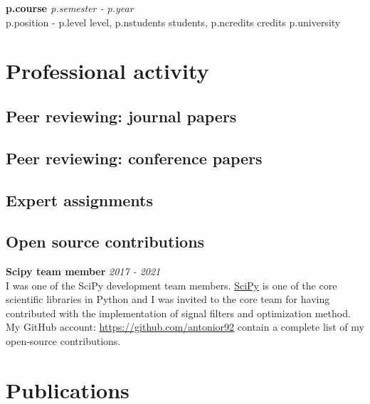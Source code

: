 \documentclass[10pt,letterpaper]{article} %
\newcommand{\cventry}[4]{ {\bf #1} \hfill {\em #2} \\ {\small \sc #3 \hfill  #4} }
\begin{document}
{{{{{{{{{{{{{%
    \cventry{ {{  p.course }}  }
    { {{ p.semester }} - {{ p.year }}  }
    { {{ p.position }}  - {{ p.level }} level, {{ p.nstudents }} students, {{ p.ncredits }} credits }
    { {{ p.university }}  } \\ {%



\section*{Professional activity}

\subsection*{Peer reviewing: journal papers}

{%

\subsection*{Peer reviewing: conference papers}

{%

\subsection*{Expert assignments}

{%


\subsection*{Open source contributions}

{\bf Scipy team member} \hfill {\em 2017 - 2021} \\
I was one of the SciPy development team members.
\href{https://www.scipy.org}{SciPy} is one of the core scientific libraries in Python and I was invited to the core team
for having contributed with the implementation of signal filters
and optimization method.
My GitHub account: \href{https://github.com/antonior92}{https://github.com/antonior92}
contain a complete list of my open-source contributions.

\section*{Publications}

}}}}}}}}}}}}}}}}}
\end{document}
